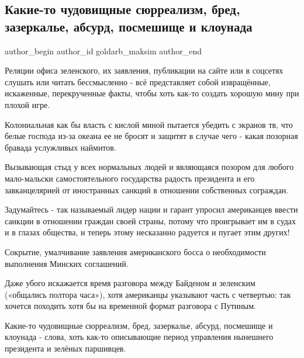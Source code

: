  
 
 
 
 
 
\subsection{Какие-то чудовищные сюрреализм, бред, зазеркалье, абсурд, посмешище и клоунада}
\label{sec:10_12_2021.fb.goldarb_maksim.1.klounada_sjurrealizm}
 
\ifcmt
 author_begin
   author_id goldarb_maksim
 author_end
\fi

Реляции офиса зеленского, их заявления, публикации на сайте или в соцсетях
слушать или читать бессмысленно - всё представляет собой извращённые,
искаженные, перекрученные факты, чтобы хоть как-то создать хорошую мину при
плохой игре. 


Колониальная как бы власть с кислой миной пытается убедить с экранов тв, что
белые господа из-за океана ее не бросят и защитят в случае чего - какая
позорная бравада услужливых наймитов. 

Вызывающая стыд у всех нормальных людей и являющаяся позором для любого
мало-мальски самостоятельного государства  радость президента и его
завканцелярией от иностранных санкций в отношении собственных сограждан. 

Задумайтесь - так называемый лидер нации и гарант упросил американцев ввести
санкции в отношении граждан своей страны, потому что проигрывает им в судах и в
глазах общества, и теперь этому несказанно радуется и пугает этим других! 🤬

Сокрытие, умалчивание заявления американского босса о необходимости выполнения
Минских соглашений. 

Даже убого искажается время разговора между Байденом и зеленским («общались
полтора часа»), хотя американцы указывают часть с четвертью: так хочется
походить хотя бы на временной формат разговора с Путиным. 

Какие-то чудовищные сюрреализм, бред, зазеркалье, абсурд, посмешище и клоунада
- слова, хоть как-то описывающие период управления нынешнего президента и
зелёных паршивцев.
